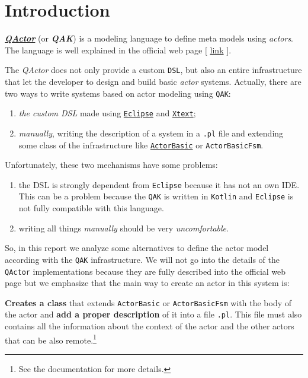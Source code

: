 \section{Introduction}

\href{http://htmlpreview.github.io/?https://github.com/anatali/issLab2021/blob/main/it.unibo.qakactor/userDocs/LabQakIntro2021.html}{\textbf{\textit{QActor}}} (or \textbf{\textit{QAK}}) is a modeling language to define meta models using \textit{actors}. The language is well explained in the official web page $\big[$ \href{http://htmlpreview.github.io/?https://github.com/anatali/issLab2021/blob/main/it.unibo.qakactor/userDocs/LabQakIntro2021.html}{link} $\big]$.

The \textit{QActor} does not only provide a custom \texttt{DSL}, but also an entire infrastructure that let the developer to design and build basic \textit{actor} systems.
Actually, there are two ways to write systems based on actor modeling using \texttt{QAK}:
\begin{enumerate}
	\item \textit{the custom DSL} made using \href{https://www.eclipse.org/}{\texttt{Eclipse}} and \href{https://www.eclipse.org/Xtext/}{\texttt{Xtext}};
	\item \textit{manually}, writing the description of a system in a \texttt{.pl} file and extending some class of the infrastructure like \href{https://htmlpreview.github.io/?https://github.com/anatali/issLab2021/blob/main/it.unibo.qakactor/userDocs/LabQakIntro2021.html\#ActorBasic}{\texttt{ActorBasic}} or \texttt{ActorBasicFsm}.
\end{enumerate}

Unfortunately, these two mechanisms have some problems:
\begin{enumerate}
	\item the DSL is strongly dependent from \texttt{Eclipse} because it has not an own IDE.
	This can be a problem because the \texttt{QAK} is written in \texttt{Kotlin} and \texttt{Eclipse} is not fully compatible with this language.
	\item writing all things \textit{manually} should be very \textit{uncomfortable}.	
\end{enumerate}

So, in this report we analyze some alternatives to define the actor model according with the \texttt{QAK} infrastructure. We will not go into the details of the \texttt{QActor} implementations because they are fully described into the official web page but we emphasize that the main way to create an actor in this system is:
\begin{center}
	\textbf{Creates a class} that extends \texttt{ActorBasic} or \texttt{ActorBasicFsm} with the body of the actor and \textbf{add a proper description} of it into a file \texttt{.pl}. This file must also contains all the information about the context of the actor and the other actors that can be also remote.\footnote{See the documentation for more details.}
\end{center}

